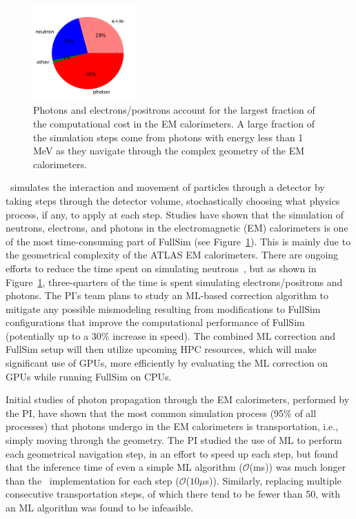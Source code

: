 \documentclass[letter, USenglish, 11pt, subfigure]{article}
\begin{document}
\begin{figure}
  \centering
  \includegraphics[width=0.35\textwidth]{figures/particleCostEMBPlusEMEC.pdf}
  \caption{\label{fig:compCostPie} Photons and electrons/positrons account for the largest fraction of the computational cost in the EM calorimeters. A large fraction of the simulation steps come from photons with energy less than 1 MeV as they navigate through the complex geometry of the EM calorimeters.}
\end{figure}

\GEANT\ simulates the interaction and movement of particles through a detector by taking steps through the detector volume, stochastically choosing what physics process, if any, to apply at each step. Studies have shown that the simulation of neutrons, electrons, and photons in the electromagnetic (EM) calorimeters is one of the most time-consuming part of FullSim (see Figure~\ref{fig:compCostPie}). This is mainly due to the geometrical complexity of the ATLAS EM calorimeters. There are ongoing efforts to reduce the time spent on simulating neutrons~\cite{nrr}, but as shown in Figure~\ref{fig:compCostPie}, three-quarters of the time is spent simulating electrons/positrons and photons. The PI's team plans to study an ML-based correction algorithm to mitigate any possible mismodeling resulting from modifications to FullSim configurations that improve the computational performance of FullSim (potentially up to a 30\% increase in speed). The combined ML correction and FullSim setup will then utilize upcoming HPC resources, which will make significant use of GPUs, more efficiently by evaluating the ML correction on GPUs while running FullSim on CPUs.

Initial studies of photon propagation through the EM calorimeters, performed by the PI, have shown that the most common simulation process (95\% of all processes) that photons undergo in the EM calorimeters is transportation, i.e., simply moving through the geometry. The PI studied the use of ML to perform each geometrical navigation step, in an effort to speed up each step, but found that the inference time of even a simple ML algorithm ($\mathcal{O}$(ms)) was much longer than the \GEANT\ implementation for each step ($\mathcal{O}$($10\mu$s)). Similarly, replacing multiple consecutive transportation steps, of which there tend to be fewer than 50, with an ML algorithm was found to be infeasible. %
\end{document}

